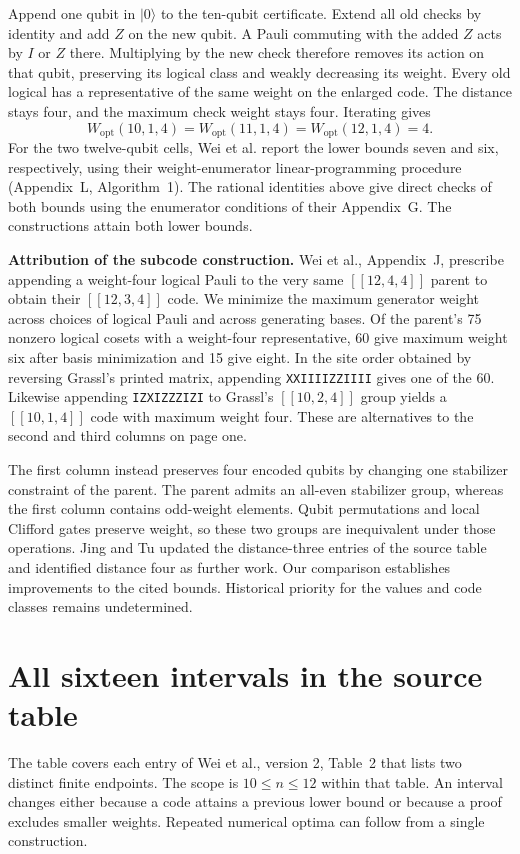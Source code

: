 \documentclass[11pt]{article}
\newcommand{\W}{W_{\mathrm{opt}}}
\begin{document}
Append one qubit in $|0\rangle$ to the ten-qubit certificate. Extend all old checks by identity and add $Z$ on the new qubit. A Pauli commuting with the added $Z$ acts by $I$ or $Z$ there. Multiplying by the new check therefore removes its action on that qubit, preserving its logical class and weakly decreasing its weight. Every old logical has a representative of the same weight on the enlarged code. The distance stays four, and the maximum check weight stays four. Iterating gives
\[
\W(10,1,4)=\W(11,1,4)=\W(12,1,4)=4.
\]
For the two twelve-qubit cells, Wei et al. report the lower bounds seven and six, respectively, using their weight-enumerator linear-programming procedure (Appendix~L, Algorithm~1). The rational identities above give direct checks of both bounds using the enumerator conditions of their Appendix~G. The constructions attain both lower bounds.

\textbf{Attribution of the subcode construction.} Wei et al., Appendix~J, prescribe appending a weight-four logical Pauli to the very same $[[12,4,4]]$ parent to obtain their $[[12,3,4]]$ code. We minimize the maximum generator weight across choices of logical Pauli and across generating bases. Of the parent's 75 nonzero logical cosets with a weight-four representative, 60 give maximum weight six after basis minimization and 15 give eight. In the site order obtained by reversing Grassl's printed matrix, appending \texttt{XXIIIIZZIIII} gives one of the 60. Likewise appending \texttt{IZXIZZZIZI} to Grassl's $[[10,2,4]]$ group yields a $[[10,1,4]]$ code with maximum weight four. These are alternatives to the second and third columns on page one.

The first column instead preserves four encoded qubits by changing one stabilizer constraint of the parent. The parent admits an all-even stabilizer group, whereas the first column contains odd-weight elements. Qubit permutations and local Clifford gates preserve weight, so these two groups are inequivalent under those operations. Jing and Tu updated the distance-three entries of the source table and identified distance four as further work. Our comparison establishes improvements to the cited bounds. Historical priority for the values and code classes remains undetermined.

\section*{All sixteen intervals in the source table}
The table covers each entry of Wei et al., version 2, Table~2 that lists two distinct finite endpoints. The scope is $10\le n\le12$ within that table. An interval changes either because a code attains a previous lower bound or because a proof excludes smaller weights. Repeated numerical optima can follow from a single construction.
\end{document}
